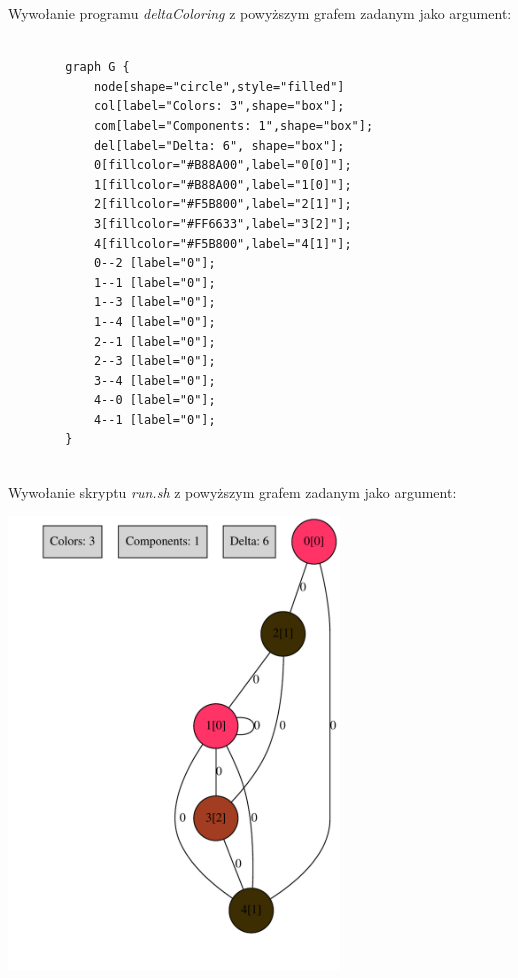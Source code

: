\documentclass[a4paper]{article}
\begin{document}
	Wywołanie programu {\em deltaColoring} z powyższym grafem zadanym jako argument:

	\begin{verbatim}

		graph G {
			node[shape="circle",style="filled"]
			col[label="Colors: 3",shape="box"];
			com[label="Components: 1",shape="box"];
			del[label="Delta: 6", shape="box"];
			0[fillcolor="#B88A00",label="0[0]"];
			1[fillcolor="#B88A00",label="1[0]"];
			2[fillcolor="#F5B800",label="2[1]"];
			3[fillcolor="#FF6633",label="3[2]"];
			4[fillcolor="#F5B800",label="4[1]"];
			0--2 [label="0"];
			1--1 [label="0"];
			1--3 [label="0"];
			1--4 [label="0"];
			2--1 [label="0"];
			2--3 [label="0"];
			3--4 [label="0"];
			4--0 [label="0"];
			4--1 [label="0"];
		}


	\end{verbatim}

	Wywołanie skryptu {\em run.sh} z powyższym grafem zadanym jako argument:
	
	\begin{center}
		\includegraphics[height=12cm]{i1.pdf}
	\end{center}
\end{document}
